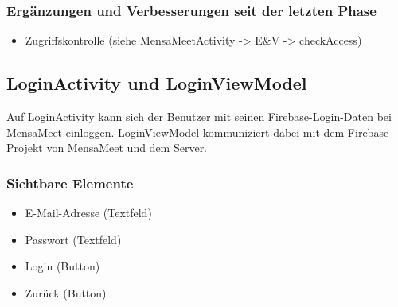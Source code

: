 \documentclass[a4paper]{scrreprt}
\begin{document}
\subsubsection{Ergänzungen und Verbesserungen seit der letzten Phase} 
\begin{itemize}
\item Zugriffskontrolle (siehe MensaMeetActivity -> E\&V -> checkAccess)
\end{itemize}

\subsection{LoginActivity und LoginViewModel}

Auf LoginActivity kann sich der Benutzer mit seinen Firebase-Login-Daten bei MensaMeet einloggen. LoginViewModel kommuniziert dabei mit dem Firebase-Projekt von MensaMeet und dem Server.

\subsubsection{Sichtbare Elemente}
\begin{itemize}
\item E-Mail-Adresse (Textfeld)
\item Passwort (Textfeld)
\item Login (Button)
\item Zurück (Button)
\end{itemize}
\end{document}
